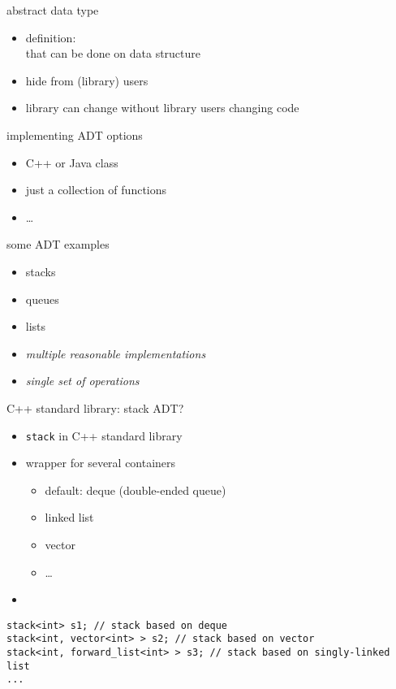 \begin{frame}{abstract data type}
\begin{itemize}
\item definition:  \\
      that can be done on data structure
\vspace{.5cm}
\item<2-> hide  from (library) users
\item<2-> library can change without library users changing code
\end{itemize}
\end{frame}


\begin{frame}{implementing ADT options}
    \begin{itemize}
    \item C++ or Java class
    \item just a collection of functions
    \item \ldots
    \end{itemize}
\end{frame}

\begin{frame}{some ADT examples}
    \begin{itemize}
        \item stacks
        \item queues
        \item lists
            \vspace{.5cm}
        \item \textit{multiple reasonable implementations}
        \item \textit{single set of operations}
    \end{itemize}
\end{frame}


\begin{frame}[fragile,label=stackAdt]{C++ standard library: stack ADT?}
\lstset{
    language=C++,
    style=small
}
\begin{itemize}
\item \texttt{stack} in C++ standard library
\item wrapper for several containers
    \begin{itemize}
    \item default: deque (double-ended queue)
    \item linked list
    \item vector
    \item \ldots
    \end{itemize}
\item {}
\end{itemize}
\begin{lstlisting}
stack<int> s1; // stack based on deque
stack<int, vector<int> > s2; // stack based on vector
stack<int, forward_list<int> > s3; // stack based on singly-linked list
...
\end{lstlisting}
\end{frame}

